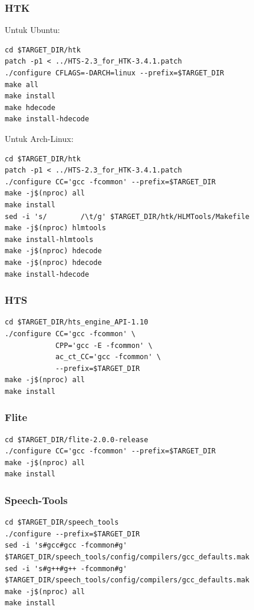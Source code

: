\documentclass[12pt,]{article}
\begin{document}
	\subsubsection{HTK}

	Untuk Ubuntu:
	\begin{verbatim}
cd $TARGET_DIR/htk
patch -p1 < ../HTS-2.3_for_HTK-3.4.1.patch
./configure CFLAGS=-DARCH=linux --prefix=$TARGET_DIR
make all
make install
make hdecode
make install-hdecode
	\end{verbatim}

	\newpage
	Untuk Arch-Linux:
	\begin{verbatim}
cd $TARGET_DIR/htk
patch -p1 < ../HTS-2.3_for_HTK-3.4.1.patch
./configure CC='gcc -fcommon' --prefix=$TARGET_DIR
make -j$(nproc) all
make install
sed -i 's/        /\t/g' $TARGET_DIR/htk/HLMTools/Makefile
make -j$(nproc) hlmtools
make install-hlmtools
make -j$(nproc) hdecode
make -j$(nproc) hdecode
make install-hdecode
	\end{verbatim}

	\subsubsection{HTS}
	\begin{verbatim}
cd $TARGET_DIR/hts_engine_API-1.10
./configure CC='gcc -fcommon' \
            CPP='gcc -E -fcommon' \
            ac_ct_CC='gcc -fcommon' \
            --prefix=$TARGET_DIR
make -j$(nproc) all
make install
	\end{verbatim}

	\subsubsection{Flite}
	\begin{verbatim}
cd $TARGET_DIR/flite-2.0.0-release
./configure CC='gcc -fcommon' --prefix=$TARGET_DIR
make -j$(nproc) all
make install
	\end{verbatim}

	\subsubsection{Speech-Tools}
	\begin{verbatim}
cd $TARGET_DIR/speech_tools
./configure --prefix=$TARGET_DIR
sed -i 's#gcc#gcc -fcommon#g' $TARGET_DIR/speech_tools/config/compilers/gcc_defaults.mak
sed -i 's#g++#g++ -fcommon#g' $TARGET_DIR/speech_tools/config/compilers/gcc_defaults.mak
make -j$(nproc) all
make install
	\end{verbatim}
\end{document}
